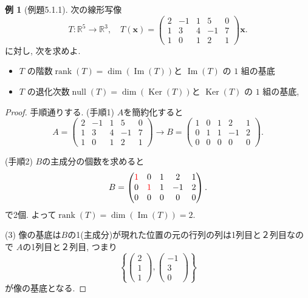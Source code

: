 \documentclass[dvipdfmx,a4paper,11pt]{article} %
\newcommand{\xr}[1]{\textcolor{red}{#1}}
\theoremstyle{definition}
\newtheorem{eg}[thm]{例}
\begin{document}
\begin{eg}[例題5.1.1]
次の線形写像
\[
T\colon\mathbb{R}^5\longrightarrow\mathbb{R}^3,
\quad
T(\bm{x})=
\begin{pmatrix}
2&-1&1&5&0\\
1&3&4&-1&7\\
1&0&1&2&1
\end{pmatrix}
\bm{x}.
\]
 に対し, 次を求めよ. 
\begin{itemize}
\item  \(T\) の階数$\operatorname{rank}(T)=\dim(\operatorname{Im}(T))$と \(\operatorname{Im}(T)\) の \(1\) 組の基底
\item \(T\) の退化次数$\operatorname{null}(T)=\dim(\operatorname{Ker}(T))$と \(\operatorname{Ker}(T)\) の \(1\) 組の基底,
\end{itemize}


\begin{proof}

手順通りする. 
(手順1) $A$を簡約化すると
\[
A=
\begin{pmatrix}
2&-1&1&5&0\\
1&3&4&-1&7\\
1&0&1&2&1
\end{pmatrix}
\longrightarrow
B=
\begin{pmatrix}
1&0&1&2&1\\
0&1&1&-1&2\\
0&0&0&0&0
\end{pmatrix}.
\]

(手順2) $B$の主成分の個数を求めると
\[
B=
\begin{pmatrix}
\xr{1}&0&1&2&1\\
0&\xr{1}&1&-1&2\\
0&0&0&0&0
\end{pmatrix}.
\]
で2個. よって$\operatorname{rank}(T)=\dim(\operatorname{Im}(T))=2$. 

(3) 像の基底は$B$の1(主成分)が現れた位置の元の行列の列は1列目と２列目なので
$A$の1列目と２列目, つまり
\[
\left\{
\begin{pmatrix}
2\\
1\\
1
\end{pmatrix},
\begin{pmatrix}
-1\\
3\\
0
\end{pmatrix}
\right\}
\]
が像の基底となる. 


\end{proof}
\end{eg}
\end{document}
